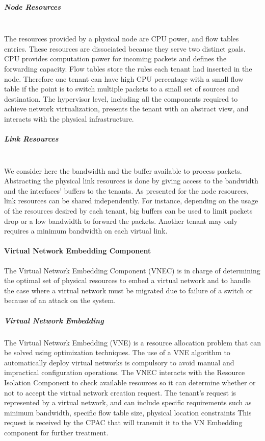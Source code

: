 \subparagraph{\textbf{Node Resources}}\textbf{}\\
The resources provided by a physical node are CPU power, and flow tables entries.
These resources are dissociated because they serve two distinct goals.
CPU provides computation power for incoming packets and defines the forwarding capacity.
Flow tables store the rules each tenant had inserted in the node.
Therefore one tenant can have high CPU percentage with a small flow table if the point is to switch multiple packets to a small set of sources and destination.
The hypervisor level, including all the components required to achieve network virtualization, presents the tenant with an abstract view, and interacts with the physical infrastructure.

\subparagraph{\textbf{Link Resources}}\textbf{}\\
We consider here the bandwidth and the buffer available to process packets.
Abstracting the physical link resources is done by giving access to the bandwidth and the interfaces' buffers to the tenants.
As presented for the node resources, link resources can be shared independently.
For instance, depending on the usage of the resources desired by each tenant, big buffers can be used to limit packets drop or a low bandwidth to forward the packets.
Another tenant may only requires a minimum bandwidth on each virtual link.

\paragraph{Virtual Network Embedding Component}

The Virtual Network Embedding Component (VNEC) is in charge of determining the optimal set of physical resources to embed a virtual network and to handle the case where a virtual network must be migrated due to failure of a switch or because of an attack on the system.

\subparagraph{Virtual Network Embedding}
The Virtual Network Embedding (VNE) is a resource allocation problem that can be solved using optimization techniques.
The use of a VNE algorithm to automatically deploy virtual networks is compulsory to avoid manual and impractical configuration operations.
The VNEC interacts with the Resource Isolation Component to check available resources so it can determine whether or not to accept the virtual network creation request.
The tenant's request is represented by a virtual network, and can include specific requirements such as minimum bandwidth, specific flow table  size, physical location constraints \etc 
This request is received by the CPAC that will transmit it to the VN Embedding component for further treatment.

